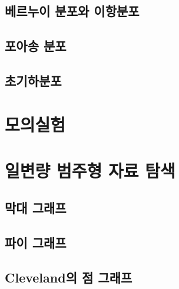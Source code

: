 \documentclass[
]{book}
\begin{document}
\hypertarget{uxbca0uxb974uxb204uxc774-uxbd84uxd3ecuxc640-uxc774uxd56duxbd84uxd3ec}{%
\subsection{베르누이 분포와 이항분포}\label{uxbca0uxb974uxb204uxc774-uxbd84uxd3ecuxc640-uxc774uxd56duxbd84uxd3ec}}

\hypertarget{uxd3ecuxc544uxc1a1-uxbd84uxd3ec}{%
\subsection{포아송 분포}\label{uxd3ecuxc544uxc1a1-uxbd84uxd3ec}}

\hypertarget{uxcd08uxae30uxd558uxbd84uxd3ec}{%
\subsection{초기하분포}\label{uxcd08uxae30uxd558uxbd84uxd3ec}}

\hypertarget{uxbaa8uxc758uxc2e4uxd5d8}{%
\section{모의실험}\label{uxbaa8uxc758uxc2e4uxd5d8}}

\hypertarget{uxc77cuxbcc0uxb7c9-uxbc94uxc8fcuxd615-uxc790uxb8cc-uxd0d0uxc0c9}{%
\section{일변량 범주형 자료 탐색}\label{uxc77cuxbcc0uxb7c9-uxbc94uxc8fcuxd615-uxc790uxb8cc-uxd0d0uxc0c9}}

\hypertarget{uxb9c9uxb300-uxadf8uxb798uxd504}{%
\subsection{막대 그래프}\label{uxb9c9uxb300-uxadf8uxb798uxd504}}

\hypertarget{uxd30cuxc774-uxadf8uxb798uxd504}{%
\subsection{파이 그래프}\label{uxd30cuxc774-uxadf8uxb798uxd504}}

\hypertarget{clevelanduxc758-uxc810-uxadf8uxb798uxd504}{%
\subsection{Cleveland의 점 그래프}\label{clevelanduxc758-uxc810-uxadf8uxb798uxd504}}
\end{document}
